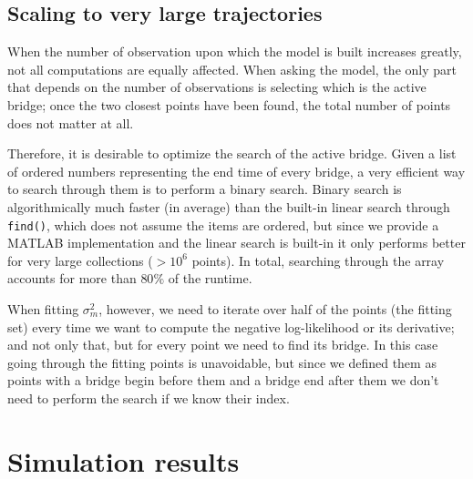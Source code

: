 \documentclass[12pt]{article}
\begin{document}

\subsection{Scaling to very large trajectories}

When the number of observation upon which the model is built increases greatly, not all computations are equally affected. When asking the model, the only part that depends on the number of observations is selecting which is the active bridge; once the two closest points have been found, the total number of points does not matter at all.

Therefore, it is desirable to optimize the search of the active bridge. Given a list of ordered numbers representing the end time of every bridge, a very efficient way to search through them is to perform a binary search. Binary search is algorithmically much faster (in average) than the built-in linear search through \texttt{find()}, which does not assume the items are ordered, but since we provide a MATLAB implementation and the linear search is built-in it only performs better for very large collections ($>10^6$ points). In total, searching through the array accounts for more than $80\%$ of the runtime.

When fitting $\sigma_m^2$, however, we need to iterate over half of the points (the fitting set) every time we want to compute the negative log-likelihood or its derivative; and not only that, but for every point we need to find its bridge. In this case going through the fitting points is unavoidable, but since we defined them as points with a bridge begin before them and a bridge end after them we don't need to perform the search if we know their index.


\clearpage
\section{Simulation results}
\end{document}

